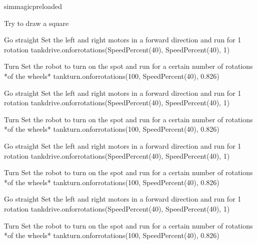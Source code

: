 \documentclass[letterpaper,10pt,english]{sphinxmanual}
\begin{document}
{
\begin{sphinxVerbatim}[commandchars=\\\{\}]
\llap{\color{nbsphinxin}[ ]:\,\hspace{\fboxrule}\hspace{\fboxsep}}\PYGZpc{}\PYGZpc{}sim\PYGZus{}magic\PYGZus{}preloaded

\PYGZsh{} Try to draw a square

\PYGZsh{}Go straight
\PYGZsh{} Set the left and right motors in a forward direction
\PYGZsh{} and run for 1 rotation
tank\PYGZus{}drive.on\PYGZus{}for\PYGZus{}rotations(SpeedPercent(40), SpeedPercent(40), 1)

\PYGZsh{}Turn
\PYGZsh{} Set the robot to turn on the spot
\PYGZsh{} and run for a certain number of rotations *of the wheels*
tank\PYGZus{}turn.on\PYGZus{}for\PYGZus{}rotations(\PYGZhy{}100, SpeedPercent(40), 0.826)

\PYGZsh{}Go straight
\PYGZsh{} Set the left and right motors in a forward direction
\PYGZsh{} and run for 1 rotation
tank\PYGZus{}drive.on\PYGZus{}for\PYGZus{}rotations(SpeedPercent(40), SpeedPercent(40), 1)

\PYGZsh{}Turn
\PYGZsh{} Set the robot to turn on the spot
\PYGZsh{} and run for a certain number of rotations *of the wheels*
tank\PYGZus{}turn.on\PYGZus{}for\PYGZus{}rotations(\PYGZhy{}100, SpeedPercent(40), 0.826)

\PYGZsh{}Go straight
\PYGZsh{} Set the left and right motors in a forward direction
\PYGZsh{} and run for 1 rotation
tank\PYGZus{}drive.on\PYGZus{}for\PYGZus{}rotations(SpeedPercent(40), SpeedPercent(40), 1)

\PYGZsh{}Turn
\PYGZsh{} Set the robot to turn on the spot
\PYGZsh{} and run for a certain number of rotations *of the wheels*
tank\PYGZus{}turn.on\PYGZus{}for\PYGZus{}rotations(\PYGZhy{}100, SpeedPercent(40), 0.826)

\PYGZsh{}Go straight
\PYGZsh{} Set the left and right motors in a forward direction
\PYGZsh{} and run for 1 rotation
tank\PYGZus{}drive.on\PYGZus{}for\PYGZus{}rotations(SpeedPercent(40), SpeedPercent(40), 1)

\PYGZsh{}Turn
\PYGZsh{} Set the robot to turn on the spot
\PYGZsh{} and run for a certain number of rotations *of the wheels*
tank\PYGZus{}turn.on\PYGZus{}for\PYGZus{}rotations(\PYGZhy{}100, SpeedPercent(40), 0.826)
\end{sphinxVerbatim}
}
\end{document}

